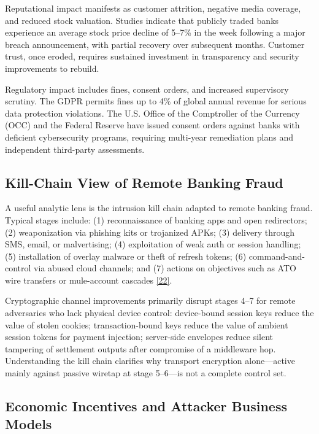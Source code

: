 \indent Reputational impact manifests as customer attrition, negative media coverage, and reduced stock valuation. Studies indicate that publicly traded banks experience an average stock price decline of 5--7\% in the week following a major breach announcement, with partial recovery over subsequent months. Customer trust, once eroded, requires sustained investment in transparency and security improvements to rebuild.

\indent Regulatory impact includes fines, consent orders, and increased supervisory scrutiny. The GDPR permits fines up to 4\% of global annual revenue for serious data protection violations. The U.S. Office of the Comptroller of the Currency (OCC) and the Federal Reserve have issued consent orders against banks with deficient cybersecurity programs, requiring multi-year remediation plans and independent third-party assessments.

\subsection{Kill-Chain View of Remote Banking Fraud}

\indent A useful analytic lens is the intrusion kill chain adapted to remote banking fraud. Typical stages include: (1) reconnaissance of banking apps and open redirectors; (2) weaponization via phishing kits or trojanized APKs; (3) delivery through SMS, email, or malvertising; (4) exploitation of weak auth or session handling; (5) installation of overlay malware or theft of refresh tokens; (6) command-and-control via abused cloud channels; and (7) actions on objectives such as ATO wire transfers or mule-account cascades \hyperref[ref:22]{[22]}.

\indent Cryptographic channel improvements primarily disrupt stages 4--7 for remote adversaries who lack physical device control: device-bound session keys reduce the value of stolen cookies; transaction-bound keys reduce the value of ambient session tokens for payment injection; server-side envelopes reduce silent tampering of settlement outputs after compromise of a middleware hop. Understanding the kill chain clarifies why transport encryption alone---active mainly against passive wiretap at stage 5--6---is not a complete control set.

\subsection{Economic Incentives and Attacker Business Models}

